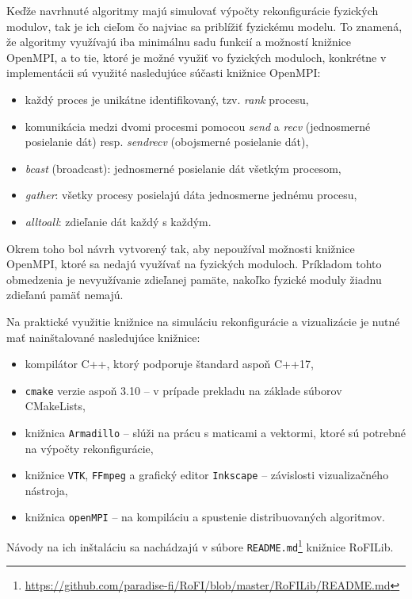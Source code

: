 \documentclass[
  printed, %
  oneside, %
  notable,   %
  nolof,     %
  nolot,     %
]{fithesis3}
\begin{document}
Keďže navrhnuté algoritmy majú simulovať výpočty rekonfigurácie fyzických modulov, tak je ich cieľom čo najviac sa priblížiť fyzickému modelu. To znamená, že algoritmy využívajú iba minimálnu sadu funkcií a možností knižnice OpenMPI, a to tie, ktoré je možné využiť vo fyzických moduloch, konkrétne v implementácii sú využité nasledujúce súčasti knižnice OpenMPI: 
\begin{itemize}
    \item každý proces je unikátne identifikovaný, tzv. \textit{rank} procesu, 
    \item komunikácia medzi dvomi procesmi pomocou \textit{send} a \textit{recv} (jednosmerné posielanie dát) resp. \textit{sendrecv} (obojsmerné posielanie dát), 
    \item \textit{bcast} (broadcast): jednosmerné posielanie dát všetkým procesom, 
    \item \textit{gather}: všetky procesy posielajú dáta jednosmerne jednému procesu, 
    \item \textit{alltoall}: zdieľanie dát každý s každým. 
\end{itemize}

Okrem toho bol návrh vytvorený tak, aby nepoužíval možnosti knižnice OpenMPI, ktoré sa nedajú využívať na fyzických moduloch. Príkladom tohto obmedzenia je nevyužívanie zdieľanej pamäte, nakoľko fyzické moduly žiadnu zdieľanú pamäť nemajú. 

Na praktické využitie knižnice na simuláciu rekonfigurácie a vizualizácie je nutné mať nainštalované nasledujúce knižnice: 
\begin{itemize}
    \item kompilátor C++, ktorý podporuje štandard aspoň C++17, 
    \item \texttt{cmake} verzie aspoň 3.10 -- v prípade prekladu na základe súborov CMakeLists, 
    \item knižnica \texttt{Armadillo} -- slúži na prácu s maticami a vektormi, ktoré sú potrebné na výpočty rekonfigurácie,  
    \item knižnice \texttt{VTK}, \texttt{FFmpeg} a grafický editor \texttt{Inkscape} -- závislosti vizualizačného nástroja, 
    \item knižnica \texttt{openMPI} -- na kompiláciu a spustenie distribuovaných algoritmov. 
\end{itemize}

 Návody na ich inštaláciu sa nachádzajú v súbore \texttt{README.md}\footnote{\url{https://github.com/paradise-fi/RoFI/blob/master/RoFILib/README.md}} knižnice RoFILib. 
\end{document}
